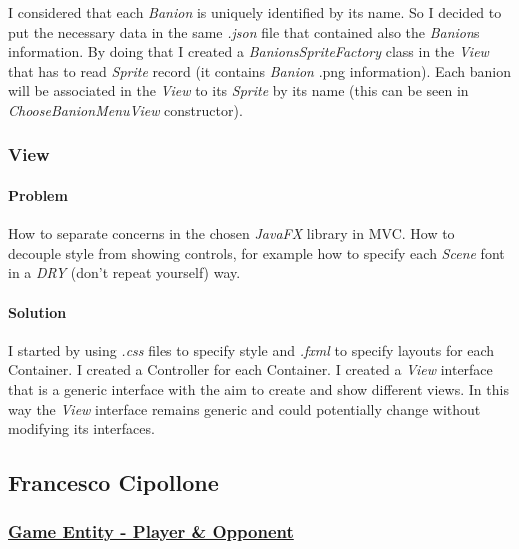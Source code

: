 \documentclass[12pt, a4paper]{report}
\theoremstyle{definition}
\begin{document}
            I considered that each \emph{Banion} is uniquely identified by its name.
            So I decided to put the necessary data in the same \textit{.json} file that contained also the \emph{Banion}s information.
            By doing that I created a \emph{BanionsSpriteFactory} class in the \emph{View} that has to read \emph{Sprite} record (it contains \emph{Banion} .png information).
            Each banion will be associated in the \emph{View} to its \emph{Sprite} by its name (this can be seen in \emph{ChooseBanionMenuView} constructor).
            
        \pagebreak

        \subsubsection{View}

            \paragraph{Problem}

            How to separate concerns in the chosen \emph{JavaFX} library in MVC.
            How to decouple style from showing controls, for example how to specify each \emph{Scene} font in a \emph{DRY} (don't repeat yourself) way.

            \paragraph{Solution}

            I started by using \textit{.css} files to specify style and \textit{.fxml} to specify layouts for each Container.
            I created a Controller for each Container.
            I created a \textit{View} interface that is a generic interface with the aim to create and show different views.
            In this way the \textit{View} interface remains generic and could potentially change without modifying its interfaces.
            
        \pagebreak

    \pagebreak

    \subsection*{Francesco Cipollone}

    \subsubsection{\underline{Game Entity - Player \& Opponent}}
\end{document}
